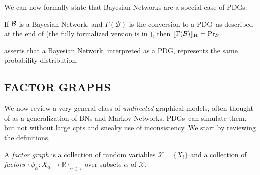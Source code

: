 \documentclass{article}
\newcommand\MaxEnt{_{\mathbf H}}
\newcommand{\MN}{PDG}
\newcommand{\MNs}{\MN s}
\numberwithin{equation}{section}
\begin{document}
	We can now formally state that Bayesian Networks are a special case of \MNs: 
	\begin{theorem}[restate=thmbnsRpdgs]\label{thm:bns-are-pdgs}
		If $\cal B$ is a Bayesian Network, and $\Gamma(\mathcal B)$ is the conversion to a \MN\ as described at the end of  (the fully formalized version is in ), then $\bbr{\Gamma(\mathcal B)}\MaxEnt = \Pr_{\cal B}$.
	\end{theorem}

	 asserts that a Bayesian Network, interpreted as a \MN, represents the same probability distribution.
	

	
	
	\subsection{FACTOR GRAPHS} \label{sec:factor-graphs}
	
	We now review a very general class of \emph{undirected} graphical models, often thought of as a generalization of BNs and Markov Networks. \MNs\ can simulate them, but not without large cpts and sneaky use of inconsistency. 
	We start by reviewing the definitions.
	
	\begin{defn}
		A \emph{factor graph} is a collection of random variables $\mathcal X = \{X_i\}$ and a collection of \emph{factors} $\{\phi_\alpha\colon X_\alpha \to \mathbb R\}_{\alpha \in \mathcal I }$ over subsets $\alpha$ of $\mathcal X$.
	\end{defn}
\end{document}

